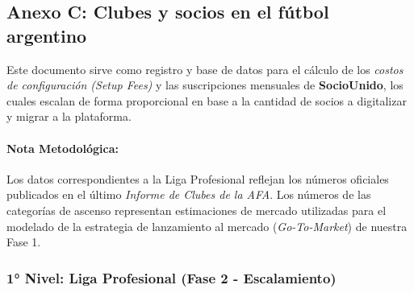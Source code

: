 \newpage

\subsection{Anexo C: Clubes y socios en el fútbol argentino}

Este documento sirve como registro y base de datos para el cálculo de los \textit{costos de configuración (Setup Fees)} y las suscripciones mensuales de \textbf{SocioUnido}, los cuales escalan de forma proporcional en base a la cantidad de socios a digitalizar y migrar a la plataforma.

\paragraph{Nota Metodológica:} Los datos correspondientes a la Liga Profesional reflejan los números oficiales publicados en el último \textit{Informe de Clubes de la AFA}. Los números de las categorías de ascenso representan estimaciones de mercado utilizadas para el modelado de la estrategia de lanzamiento al mercado (\textit{Go-To-Market}) de nuestra Fase 1.

\subsubsection{1° Nivel: Liga Profesional (Fase 2 - Escalamiento)}

